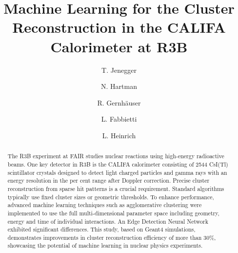 \documentclass[review,sort&compress]{elsarticle}
\begin{document}
\linenumbers
\begin{frontmatter}



\title{Machine Learning for the Cluster Reconstruction in the CALIFA Calorimeter at R3B}

\author[1]{T. Jenegger}
\author[1]{N. Hartman}
\author[1]{R. Gernh\"auser}
\author[1]{L. Fabbietti}
\author[1]{L. Heinrich}
\address[1]{{TUM School of Natural Sciences, Technical University of Munich},%
            {Germany}}

\begin{abstract}

The R3B experiment at FAIR studies nuclear reactions using high-energy radioactive beams. One key detector in R3B is the CALIFA calorimeter consisting of 2544 CsI(Tl) scintillator crystals designed to detect light charged particles and  gamma rays with an energy resolution in the per cent range after Doppler correction. Precise cluster reconstruction from sparse hit patterns is a crucial requirement. Standard algorithms typically use fixed cluster sizes or geometric thresholds. To enhance performance, advanced machine learning techniques such as agglomerative clustering were implemented to use the full multi-dimensional parameter space including geometry, energy and time of individual interactions. An Edge Detection Neural Network exhibited significant differences. This study, based on Geant4 simulations, demonstrates improvements in cluster reconstruction efficiency of more than 30\%, showcasing the potential of machine learning in nuclear physics experiments.
\end{abstract}


\end{frontmatter}
\end{document}
